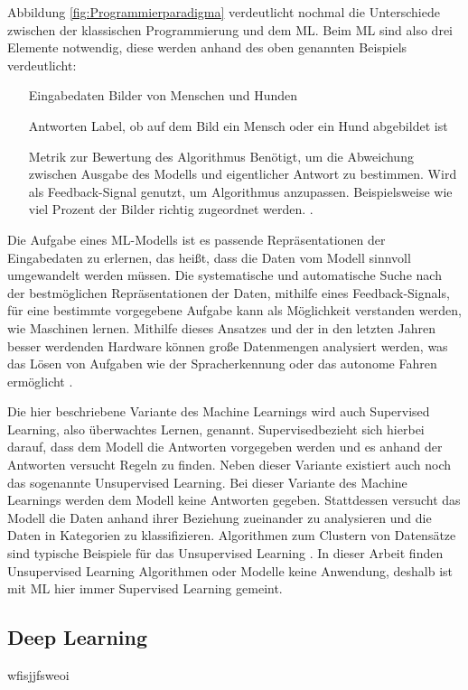 Abbildung \ref*{fig:Programmierparadigma} verdeutlicht nochmal die Unterschiede zwischen der klassischen Programmierung und dem \ac{ML}. Beim \ac{ML} sind also drei Elemente
notwendig, diese werden anhand des oben genannten Beispiels verdeutlicht: 
\begin{enumerate}[leftmargin=*,labelindent=16pt,font=\bfseries, nolistsep]
    \item[Eingabedaten] Bilder von Menschen und Hunden \cite[S.24]{DL_PY}
    \item[Antworten] Label, ob auf dem Bild ein Mensch oder ein Hund abgebildet ist \cite[S.24]{DL_PY}
    \item[Metrik zur Bewertung des Algorithmus] Benötigt, um die Abweichung zwischen Ausgabe des Modells und eigentlicher Antwort zu bestimmen. Wird als Feedback-Signal genutzt,
    um Algorithmus anzupassen. Beispielsweise wie viel Prozent der Bilder richtig zugeordnet werden. \cite[S.24f.]{DL_PY}.  
\end{enumerate}

Die Aufgabe eines \ac{ML}-Modells ist es passende Repräsentationen der Eingabedaten zu erlernen, das heißt, dass die Daten vom Modell sinnvoll umgewandelt werden müssen. 
Die systematische und automatische Suche nach der bestmöglichen Repräsentationen der Daten, mithilfe eines Feedback-Signals, für eine bestimmte vorgegebene Aufgabe kann als Möglichkeit verstanden werden, wie 
Maschinen lernen. Mithilfe dieses Ansatzes und der in den letzten Jahren besser werdenden Hardware können große Datenmengen analysiert werden, was das Lösen von Aufgaben wie der Spracherkennung 
oder das autonome Fahren ermöglicht \cite[vgl. S.24ff.]{DL_PY}.


Die hier beschriebene Variante des Machine Learnings wird auch Supervised Learning, also überwachtes Lernen, genannt. \glqq Supervised\grqq bezieht sich hierbei darauf, dass
dem Modell die Antworten vorgegeben werden und es anhand der Antworten versucht Regeln zu finden. Neben dieser Variante existiert auch noch das sogenannte
Unsupervised Learning. Bei dieser Variante des Machine Learnings werden dem Modell keine Antworten gegeben. Stattdessen versucht das Modell die Daten anhand ihrer
Beziehung zueinander zu analysieren und die Daten in Kategorien zu klassifizieren. Algorithmen zum Clustern von Datensätze sind typische Beispiele für das Unsupervised Learning
\cite[vgl. S.47ff.]{AI_Huawei}. In dieser Arbeit finden Unsupervised Learning Algorithmen oder Modelle keine Anwendung, deshalb ist mit \ac{ML} hier immer Supervised Learning gemeint.


\subsection{Deep Learning}

wfisjjfsweoi